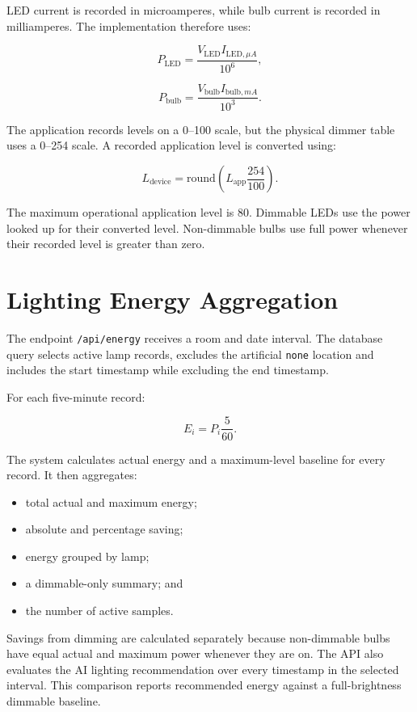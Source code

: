 LED current is recorded in microamperes, while bulb current is recorded in
milliamperes. The implementation therefore uses:

\[
    P_{\mathrm{LED}} =
    \frac{V_{\mathrm{LED}}I_{\mathrm{LED},\mu A}}{10^6},
\]

\[
    P_{\mathrm{bulb}} =
    \frac{V_{\mathrm{bulb}}I_{\mathrm{bulb},mA}}{10^3}.
\]

The application records levels on a 0--100 scale, but the physical dimmer table
uses a 0--254 scale. A recorded application level is converted using:

\[
    L_{\mathrm{device}} =
    \mathrm{round}\left(L_{\mathrm{app}}\frac{254}{100}\right).
\]

The maximum operational application level is 80. Dimmable LEDs use the power
looked up for their converted level. Non-dimmable bulbs use full power whenever
their recorded level is greater than zero.

\section{Lighting Energy Aggregation}

The endpoint \texttt{/api/energy} receives a room and date interval. The
database query selects active lamp records, excludes the artificial
\texttt{none} location and includes the start timestamp while excluding the
end timestamp.

For each five-minute record:

\[
    E_i = P_i\frac{5}{60}.
\]

The system calculates actual energy and a maximum-level baseline for every
record. It then aggregates:

\begin{itemize}
    \item total actual and maximum energy;
    \item absolute and percentage saving;
    \item energy grouped by lamp;
    \item a dimmable-only summary; and
    \item the number of active samples.
\end{itemize}

Savings from dimming are calculated separately because non-dimmable bulbs have
equal actual and maximum power whenever they are on. The API also evaluates
the AI lighting recommendation over every timestamp in the selected interval.
This comparison reports recommended energy against a full-brightness dimmable
baseline.

